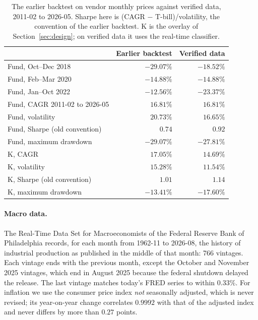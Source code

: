 \documentclass[11pt,a4paper]{article}
\begin{document}
\begin{table}[htbp]
\centering
\caption{The earlier backtest on vendor monthly prices against verified data, 2011-02 to 2026-05. Sharpe
here is (CAGR $-$ T-bill)/volatility, the convention of the earlier backtest. K is the overlay of
Section~\ref{sec:design}; on verified data it uses the real-time classifier.}
\label{tab:old}
\small
\begin{tabular}{@{}lrr@{}}
\toprule
& Earlier backtest & Verified data \\
\midrule
Fund, Oct--Dec 2018 & $-29.07\%$ & $-18.52\%$ \\
Fund, Feb--Mar 2020 & $-14.88\%$ & $-14.88\%$ \\
Fund, Jan--Oct 2022 & $-12.56\%$ & $-23.37\%$ \\
Fund, CAGR 2011-02 to 2026-05 & $16.81\%$ & $16.81\%$ \\
Fund, volatility & $20.73\%$ & $16.65\%$ \\
Fund, Sharpe (old convention) & $0.74$ & $0.92$ \\
Fund, maximum drawdown & $-29.07\%$ & $-27.81\%$ \\
\midrule
K, CAGR & $17.05\%$ & $14.69\%$ \\
K, volatility & $15.28\%$ & $11.54\%$ \\
K, Sharpe (old convention) & $1.01$ & $1.14$ \\
K, maximum drawdown & $-13.41\%$ & $-17.60\%$ \\
\bottomrule
\end{tabular}
\end{table}

\paragraph{Macro data.} The Real-Time Data Set for Macroeconomists of the Federal Reserve Bank of
Philadelphia \citep{croushore2001} records, for each month from 1962-11 to 2026-08, the history of
industrial production as published in the middle of that month: 766 vintages. Each vintage ends with the
previous month, except the October and November 2025 vintages, which end in August 2025 because the federal
shutdown delayed the release. The last vintage matches today's FRED series to within $0.33\%$. For
inflation we use the consumer price index \emph{not} seasonally adjusted, which is never revised; its
year-on-year change correlates $0.9992$ with that of the adjusted index and never differs by more than
$0.27$ points.
\end{document}
